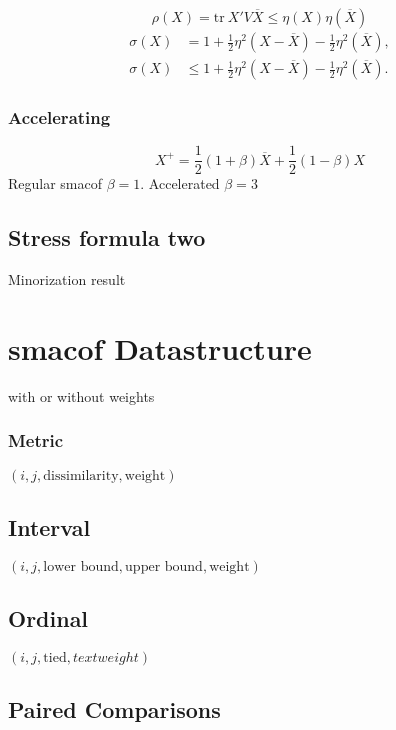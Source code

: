 \documentclass[
  12pt,
  letterpaper,
  DIV=11,
  numbers=noendperiod]{scrartcl}
\newcommand{\sectionbreak}{\clearpage}
\theoremstyle{plain}
\theoremstyle{remark}
\begin{document}
\[
\rho(X)=\text{tr}\ X'V\overline X\leq\eta(X)\eta(\overline X)
\] \begin{align}
\sigma(X)&=1+\frac12\eta^2(X-\overline X)-\frac12\eta^2(\overline X),\\
\sigma(X)&\leq 1+\frac12\eta^2(X-\overline X)-\frac12\eta^2(\overline X).
\end{align}

\subsubsection{Accelerating}\label{accelerating}

\[
X^+=\frac12(1+\beta)\overline{X}+\frac12(1-\beta)X
\] Regular smacof \(\beta = 1\). Accelerated \(\beta=3\)

\subsection{Stress formula two}\label{stress-formula-two}

Minorization result

\sectionbreak

\section{smacof Datastructure}\label{smacof-datastructure}

with or without weights

\subsubsection{Metric}\label{metric}

\((i, j, \text{dissimilarity}, \text{weight})\)

\subsection{Interval}\label{interval}

\((i, j, \text{lower bound}, \text{upper bound}, \text{weight})\)

\subsection{Ordinal}\label{ordinal}

\((i, j, \text{tied}, text{weight})\)

\subsection{Paired Comparisons}\label{paired-comparisons}
\end{document}
